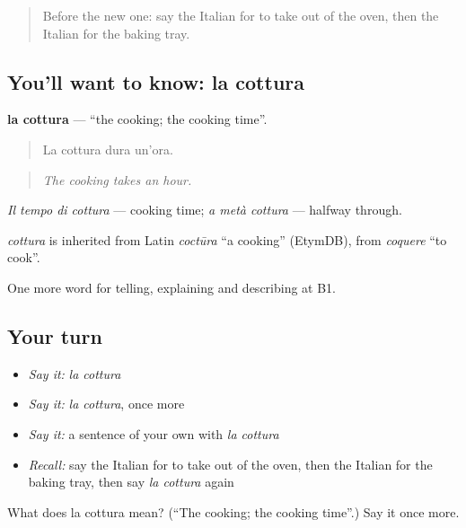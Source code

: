 \label{lesson:IT-C336-cottura}



\begin{quote}
Before the new one: say the Italian for to take out of the oven, then the Italian for the baking tray.
\end{quote}

\subsection*{You'll want to know: la cottura}
\textbf{la cottura} — \textquotedblleft{}the cooking; the cooking time\textquotedblright{}.

\begin{quote}
La cottura dura un'ora.
\end{quote}

\begin{quote}
\emph{The cooking takes an hour.}
\end{quote}

\emph{Il tempo di cottura} — cooking time; \emph{a metà cottura} — halfway through.

\begin{cousinweb}
\emph{cottura} is inherited from Latin \emph{coctūra} \textquotedblleft{}a cooking\textquotedblright{} (EtymDB), from \emph{coquere} \textquotedblleft{}to cook\textquotedblright{}.
\end{cousinweb}

\begin{grammarlens}[title={What you've built}]
One more word for telling, explaining and describing at B1.
\end{grammarlens}

\subsection*{Your turn}
\begin{itemize}
\raggedright
  \item \emph{Say it:} \emph{la cottura}
  \item \emph{Say it:} \emph{la cottura}, once more
  \item \emph{Say it:} a sentence of your own with \emph{la cottura}
  \item \emph{Recall:} say the Italian for to take out of the oven, then the Italian for the baking tray, then say \emph{la cottura} again
\end{itemize}

\begin{tcolorbox}[breakable,colback=teal!4,colframe=teal!35!black,title={Before you move on}]
What does la cottura mean? (\textquotedblleft{}The cooking; the cooking time\textquotedblright{}.) Say it once more.
\end{tcolorbox}
